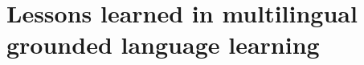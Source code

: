 %
%










\chapter{Lessons learned in multilingual grounded language learning}
\label{ch:ConLL}


